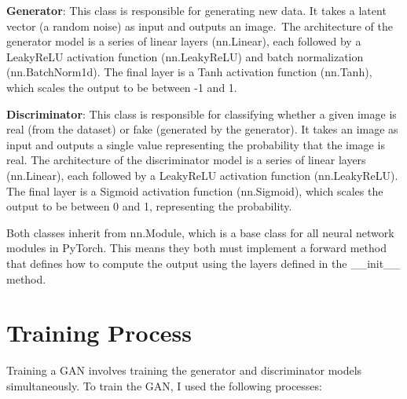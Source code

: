 \documentclass{genai}
\begin{document}
\textbf{Generator}: This class is responsible for generating new data. It takes a latent vector (a random noise) as input and outputs an image.\
The architecture of the generator model is a series of linear layers (nn.Linear), each followed by a LeakyReLU activation function (nn.LeakyReLU) and batch normalization (nn.BatchNorm1d).
The final layer is a Tanh activation function (nn.Tanh), which scales the output to be between -1 and 1.

\textbf{Discriminator}: This class is responsible for classifying whether a given image is real (from the dataset) or fake (generated by the generator).
It takes an image as input and outputs a single value representing the probability that the image is real.
The architecture of the discriminator model is a series of linear layers (nn.Linear), each followed by a LeakyReLU activation function (nn.LeakyReLU).
The final layer is a Sigmoid activation function (nn.Sigmoid), which scales the output to be between 0 and 1, representing the probability.

Both classes inherit from nn.Module, which is a base class for all neural network modules in PyTorch.
This means they both must implement a forward method that defines how to compute the output using the layers defined in the \_\_init\_\_ method.

\section{Training Process}

Training a GAN involves training the generator and discriminator models simultaneously.
To train the GAN, I used the following processes:
\end{document}
